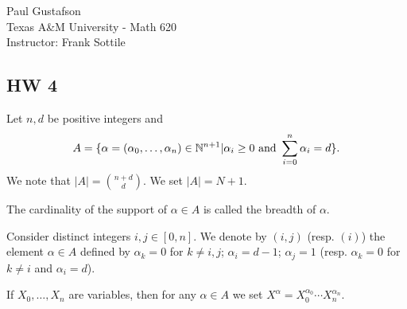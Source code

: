 \documentclass{article}
\begin{document}
\noindent Paul Gustafson\\
\noindent Texas A\&M University - Math 620\\ 
\noindent Instructor: Frank Sottile

\subsection*{HW 4}
 Let  $n, d$ be positive integers and 
$$ A = \{\alpha = (\alpha_0, \ldots, \alpha_n) \in \mathbb{N}^{n+1} | \alpha_i \ge 0 \text{ and } \sum_{i=0}^n \alpha_i = d \}.$$
We note that $|A| = {{n+d} \choose d }$. We set $|A| = N + 1$.

The cardinality of the support of $\alpha \in A$ is called the breadth of $\alpha$.

Consider distinct integers $i,j \in [0,n]$. We denote by $(i,j)$ (resp. $(i)$) the element $\alpha \in A$ defined by $\alpha_k = 0$ for $k \neq i,j$; $\alpha_i = d- 1$; $\alpha_j = 1$ (resp. $\alpha_k = 0$ for $k \neq i$ and $\alpha_i = d$).

If $X_0, \ldots, X_n$ are variables, then for any $\alpha \in A$ we set $X^\alpha = X_0^{\alpha_0} \cdots X_n^{\alpha_n}$.
\end{document}

